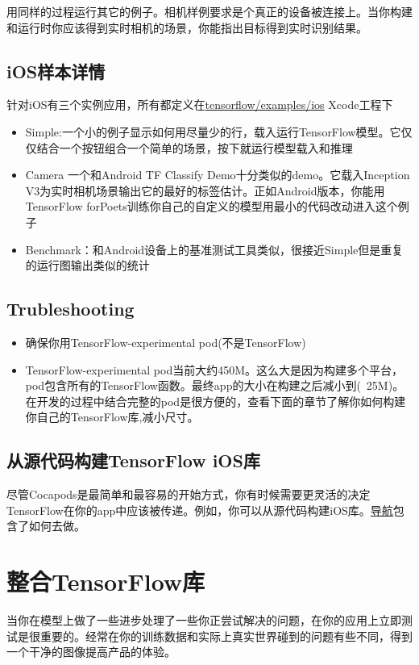 用同样的过程运行其它的例子。相机样例要求是个真正的设备被连接上。当你构建和运行时你应该得到实时相机的场景，你能指出目标得到实时识别结果。
\subsection{iOS样本详情}
针对iOS有三个实例应用，所有都定义在\href{https://www.github.com/tensorflow/tensorflow/blob/r1.4/tensorflow/examples/ios/}{tensorflow/examples/ios} Xcode工程下
\begin{itemize}
\item Simple:一个小的例子显示如何用尽量少的行，载入运行TensorFlow模型。它仅仅结合一个按钮组合一个简单的场景，按下就运行模型载入和推理
\item Camera 一个和Android TF Classify Demo十分类似的demo。它载入Inception V3为实时相机场景输出它的最好的标签估计。正如Android版本，你能用TensorFlow forPoets训练你自己的自定义的模型用最小的代码改动进入这个例子
\item Benchmark：和Android设备上的基准测试工具类似，很接近Simple但是重复的运行图输出类似的统计
\end{itemize}
\subsection{Trubleshooting}
\begin{itemize}
\item 确保你用TensorFlow-experimental pod(不是TensorFlow)
\item TensorFlow-experimental pod当前大约450M。这么大是因为构建多个平台，pod包含所有的TensorFlow函数。最终app的大小在构建之后减小到(~25M)。在开发的过程中结合完整的pod是很方便的，查看下面的章节了解你如何构建你自己的TensorFlow库,减小尺寸。
\end{itemize}
\subsection{从源代码构建TensorFlow iOS库}
尽管Cocapods是最简单和最容易的开始方式，你有时候需要更灵活的决定TensorFlow在你的app中应该被传递。例如，你可以从源代码构建iOS库。\href{https://github.com/tensorflow/tensorflow/tree/master/tensorflow/examples/ios#building-the-tensorflow-ios-libraries-from-source}{导航}包含了如何去做。
\section{整合TensorFlow库}
当你在模型上做了一些进步处理了一些你正尝试解决的问题，在你的应用上立即测试是很重要的。经常在你的训练数据和实际上真实世界碰到的问题有些不同，得到一个干净的图像提高产品的体验。

